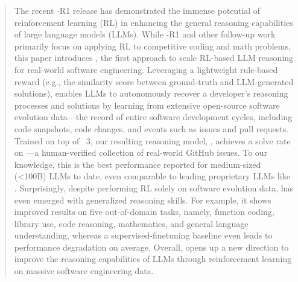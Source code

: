 \begin{abstract}
The recent \dpsk-R1 release has demonstrated the immense potential of reinforcement learning (RL) in enhancing the general reasoning capabilities of large language models (LLMs). 
While \dpsk-R1 and other follow-up work primarily focus on applying RL to competitive coding and math problems,
this paper introduces \tech, the first approach to scale RL-based LLM reasoning for real-world software engineering.
Leveraging a lightweight rule-based reward (e.g., the similarity score between ground-truth and LLM-generated solutions), \tech enables LLMs to autonomously recover a developer's reasoning processes and solutions by learning from extensive open-source software evolution data---the record of entire software development cycles, including code snapshots, code changes, and events such as issues and pull requests.
Trained on top of \llama~3, our resulting reasoning model, \ours[70], achieves a \textbf{\swebfinalbig{\%}} solve rate on \swebverified---a human-verified collection of real-world GitHub issues.
To our knowledge, this is the best performance reported for medium-sized (<100B) LLMs to date, even comparable to leading proprietary LLMs like .
Surprisingly, despite performing RL solely on software evolution data, \ours has even emerged with generalized reasoning skills.
For example, it shows improved results on five out-of-domain tasks, namely, function coding, library use, code reasoning, mathematics, and general language understanding, whereas a supervised-finetuning baseline even leads to performance degradation on average.
Overall, \tech opens up a new direction to improve the reasoning capabilities of LLMs through reinforcement learning on massive software engineering data.
\end{abstract}






